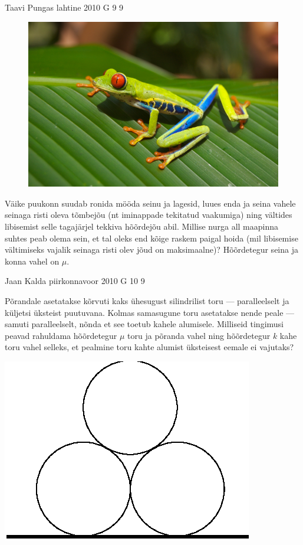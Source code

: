 \documentclass[11pt]{article}
\begin{document}
{%
{Taavi Pungas} %
{lahtine} %
{2010} %
{G 9} %
{9} %
{
\ifStatement
\begin{figure}
	\vspace{-1.8ex}
	\includegraphics[width=\linewidth]{2010-lahg-09-Red_eyed_tree_frog}
	\vspace{-4ex}
\end{figure}
Väike puukonn suudab ronida mööda seinu ja lagesid, luues enda ja seina vahele 
seinaga risti oleva tõmbejõu (nt iminappade tekitatud vaakumiga) ning vältides libisemist 
selle tagajärjel tekkiva hõõrdejõu abil.
Millise nurga all maapinna suhtes peab olema sein, et tal oleks end kõige raskem paigal hoida 
(mil libisemise vältimiseks vajalik seinaga risti olev jõud on maksimaalne)?
Hõõrdetegur seina ja konna vahel on $\mu$.
\fi
}

{Jaan Kalda} %
{piirkonnavoor} %
{2010} %
{G 10} %
{9} %
{
\ifStatement
Põrandale asetatakse kõrvuti kaks ühesugust silindrilist toru --- paralleelselt ja küljetsi üksteist puutuvana. Kolmas samasugune toru asetatakse nende peale --- samuti paralleelselt, nõnda et see toetub kahele alumisele.
Milliseid tingimusi peavad rahuldama hõõrdetegur $\mu$ toru ja põranda vahel ning hõõrdetegur $k$ kahe toru vahel
selleks, et pealmine toru kahte alumist üksteisest eemale ei vajutaks?

\begin{center}
	\includegraphics[width=0.3\linewidth]{2010-v2g-10-torud.eps}
\end{center}
\fi
}

}
\end{document}
